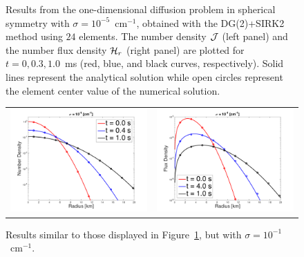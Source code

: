 \documentclass[10pt,preprint]{aastex}
\begin{document}
\begin{figure}
\begin{center}
\begin{tabular}{cc}
    \end{tabular}
  \end{center}
  \caption{Results from the one-dimensional diffusion problem in spherical symmetry with $\sigma=10^{-5}$~cm$^{-1}$, obtained with the DG(2)+SIRK2 method using $24$ elements.  
  The number density $\mathcal{J}$ (left panel) and the number flux density $\mathcal{H}_{r}$ (right panel) are plotted for $t=0,0.3,1.0$~ms (red, blue, and black curves, respectively).  
  Solid lines represent the analytical solution while open circles represent the element center value of the numerical solution.}
  \label{fig:diffusionProblem1e-5}
\end{figure}

\begin{figure}
  \begin{center}
    \begin{tabular}{cc}
      \includegraphics[scale=0.38]{./Figures/GaussianSphericalDiffusion_Kappa_1e-1_Density} &
      \includegraphics[scale=0.38]{./Figures/GaussianSphericalDiffusion_Kappa_1e-1_Flux}
    \end{tabular}
  \end{center}
  \caption{Results similar to those displayed in Figure~\ref{fig:diffusionProblem1e-5}, but with $\sigma=10^{-1}$~cm$^{-1}$.}
  \label{fig:diffusionProblem1e-1}
\end{figure}
\end{document}
